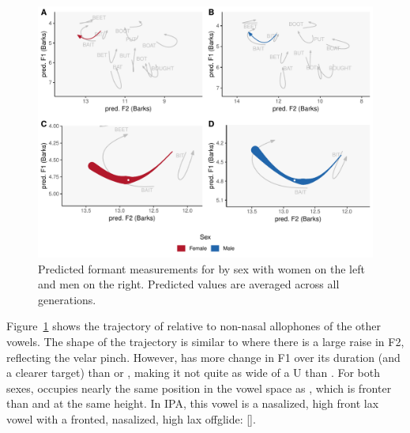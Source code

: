 \begin{figure}[tb!]
    \centering
    \includegraphics[width = 6.5in]{Figures/BING/BING_four_panel_plot_summarized.pdf}
    \caption[Predicted formant measurements for \bing by sex.]{Predicted formant measurements for \bing by sex with women on the left and men on the right. Predicted values are averaged across all generations.}
    \label{fig:BING_four_panel_plot_summarized}
\end{figure}

Figure~\ref{fig:BING_four_panel_plot_summarized} shows the trajectory of \bing relative to non-nasal allophones of the other vowels. The shape of the trajectory is similar to \bang where there is a large raise in F2, reflecting the velar pinch. However, \bing has more change in F1 over its duration (and a clearer target) than \bang or \beng, making it not quite as wide of a U than \bang. For both sexes, \bing occupies nearly the same position in the vowel space as \face, which is fronter than \bit and at the same height. In IPA, this vowel is a nasalized, high front lax vowel with a fronted, nasalized, high lax offglide:  [].

